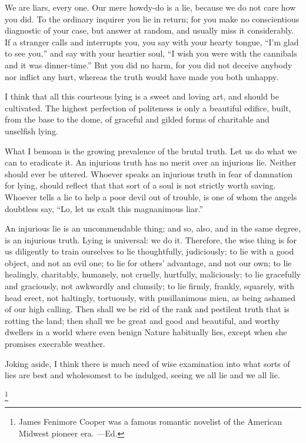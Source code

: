 \documentclass{novelette}
\begin{document}
We are liars, every one. Our mere {howdy-do}
is a lie, because we do not care how you did.
To the ordinary inquirer you lie in return; for you make
no conscientious diagnostic of your case, but answer at random, and
usually miss it considerably. If a stranger calls and interrupts
you, you say with your hearty tongue, ``I'm glad to see you,'' and say
with your heartier soul, ``I wish you were with the cannibals and it was
dinner-time.'' But you did no harm, for you did not
deceive anybody nor inflict any hurt, whereas the truth would have made
you both unhappy.

I think that all this courteous lying is a sweet and loving art, and
should be cultivated. The highest perfection of politeness is only a
beautiful edifice, built, from the base to the dome, of graceful and
gilded forms of charitable and unselfish lying.

What I bemoan is the growing prevalence of the brutal truth. Let us do
what we can to eradicate it. An injurious truth has no merit over an
injurious lie. Neither should ever be uttered. Whoever speaks an
injurious truth in fear of damnation for lying, should
reflect that that sort of a soul is not strictly worth saving.
Whoever tells a lie to help a poor devil out of trouble, is one of whom the
angels doubtless say, ``Lo, let us exalt this magnanimous liar.''

An injurious lie is an uncommendable thing; and so, also, and in the same
degree, is an injurious truth. Lying is universal: we  do it.
Therefore, the wise thing is for us
diligently to train ourselves to lie thoughtfully, judiciously; to lie
with a good object, and not an evil one; to lie for others' advantage,
and not our own; to lie healingly, charitably, humanely, not cruelly,
hurtfully, maliciously; to lie gracefully and graciously, not awkwardly
and clumsily; to lie firmly, frankly, squarely, with head erect, not
haltingly, tortuously, with pusillanimous mien, as being ashamed of our
high calling. Then shall we be rid of the rank and pestilent truth that
is rotting the land; then shall we be great and good and beautiful, and
worthy dwellers in a world where even benign Nature habitually lies,
except when she promises execrable weather.

Joking aside, I think there is much need of wise examination into what
sorts of lies are best and wholesomest to be indulged, seeing we 
all lie and we  all lie.




\begin{opening}
\null\null\null\null\null\null
{}
\null
{}
\footnote{James Fenimore Cooper was
a famous romantic novelist of the American Midwest pioneer era. ---Ed.}

\null\null\null\null
\end{opening}
\end{document}
